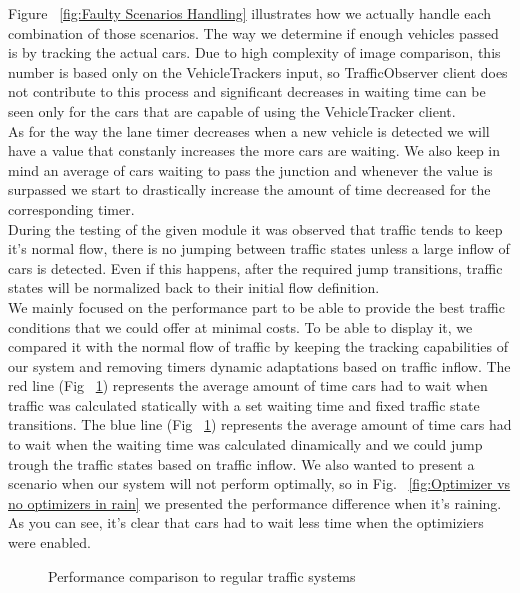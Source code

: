 \documentclass[17pt]{report}
\begin{document}
\indent
Figure ~\ref{fig:Faulty Scenarios Handling} illustrates how 
we actually handle each combination of those scenarios. The way we determine if enough vehicles passed is by 
tracking the actual cars. Due to high complexity of image 
comparison, this number is based only on the VehicleTrackers 
input, so TrafficObserver client does not contribute to this process 
and significant decreases in waiting time can be seen only for the 
cars that are capable of using the VehicleTracker client.\\
\indent
As for the way the lane timer decreases when a new vehicle is
detected we will have a value that constanly increases the more cars 
are waiting. We also keep in mind an average of cars 
waiting to pass the junction and whenever the value is surpassed 
we start to drastically increase the amount of time decreased 
for the corresponding timer.\\
\indent
During the testing of the given module it was observed that traffic tends to keep it's 
normal flow, there is no jumping between traffic states unless a large inflow of cars is 
detected. Even if this happens, after the required jump transitions, traffic states will 
be normalized back to their initial flow definition. \\
\indent
We mainly focused on the performance part to be able to provide
the best traffic conditions that we could offer at minimal costs.
To be able to display it, we compared it with the normal 
flow of traffic by keeping the tracking capabilities of our system 
and removing timers dynamic adaptations based on traffic inflow. 
The red line (Fig ~\ref{fig:Optimizer vs no optimizers}) represents the 
average amount of time cars had to wait when traffic was 
calculated statically with a set waiting time and fixed traffic state 
transitions. The blue line (Fig ~\ref{fig:Optimizer vs no optimizers}) 
represents the average amount of time cars had to wait when the 
waiting time was calculated dinamically and we could jump trough 
the traffic states based on traffic inflow. We also wanted to present a 
scenario when our system will not perform optimally, so in Fig. 
~\ref{fig:Optimizer vs no optimizers in rain} we presented 
the performance difference when it's raining. As you can see,
it's clear that cars had to wait less time when the optimiziers
were enabled. \\
\begin{figure}[h!]
    \centering
    \label{fig:Optimizer vs no optimizers}
    \caption{Performance comparison to regular traffic systems}
\end{figure}
\end{document}
